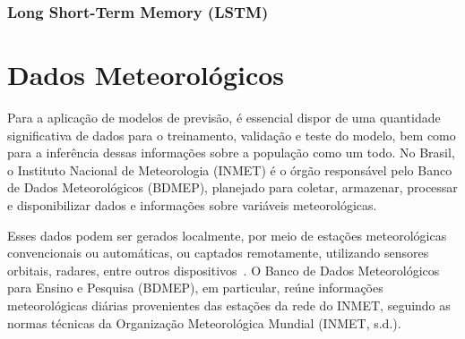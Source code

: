         \subsubsection{Long Short-Term Memory (LSTM)}


\section{Dados Meteorológicos}

    Para a aplicação de modelos de previsão, é essencial dispor de uma quantidade significativa de dados para o 
    treinamento, validação e teste do modelo, bem como para a inferência dessas informações sobre a população como um 
    todo. No Brasil, o Instituto Nacional de Meteorologia (INMET) é o órgão responsável pelo Banco de Dados 
    Meteorológicos (BDMEP), planejado para coletar, armazenar, processar e disponibilizar dados e informações sobre 
    variáveis meteorológicas. 
    
    Esses dados podem ser gerados localmente, por meio de estações meteorológicas convencionais ou automáticas, 
    ou captados remotamente, utilizando sensores orbitais, radares, entre outros dispositivos~\cite{vianna2017}. 
    O Banco de Dados Meteorológicos para Ensino e Pesquisa (BDMEP), em particular, reúne informações meteorológicas 
    diárias provenientes das estações da rede do INMET, seguindo as normas técnicas da Organização Meteorológica 
    Mundial (INMET, s.d.).